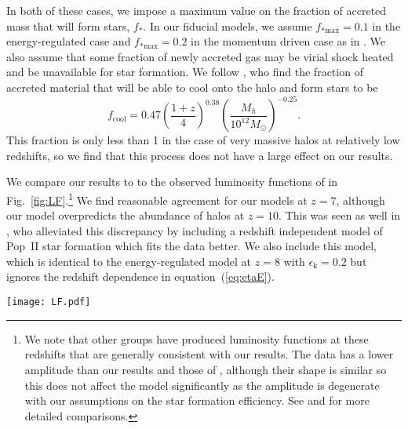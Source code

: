 \documentclass[a4paper,fleqn,usenatbib]{mnras}
\begin{document}
In both of these cases, we 
impose a maximum value on the fraction of accreted mass that will form stars, $f_\ast$. In our fiducial 
models, we assume $f_{\ast \text{max}} = 0.1$ in the energy-regulated case and $f_{\ast \text{max}} = 0.2$ in the momentum driven case as in \citet{furlanetto_2016}. We also assume that some fraction of newly accreted gas may be virial shock heated and be unavailable for star formation. We follow \citet{faucher_2011}, who find the fraction of accreted material that will be able to cool onto the halo and form stars to be
\begin{equation}
f_\text{cool} = 0.47 \left( \frac{1+z}{4} \right)^{0.38} \left( \frac{M_h}{10^{12} M_\odot} \right)^{-0.25}.
\end{equation}
This fraction is only less than 1 in the case of very massive halos at relatively 
low redshifts, so we find that this process does not have a large effect on our results.

We compare our results to to the observed luminosity functions of \citet{bouwens_2015} in Fig.~\ref{fig:LF}.\footnote{We note that other groups have produced luminosity functions at these redshifts \citep[e.g.,][]{mclure_2013, oesch_2013, schenker_2013, bowler_2015, finkelstein_2015} that are generally consistent with our results. The \citet{finkelstein_2015} data has a lower amplitude than our results and those of \citet{bouwens_2015}, although their shape is similar so this does not affect the model significantly as the amplitude is degenerate with our assumptions on the star formation efficiency. See \citet{mirocha_2016} and \citet{mason_2015} for more detailed comparisons.} We find reasonable agreement for our models at $z=7$, although our model overpredicts the abundance of halos at $z=10$. This was seen as well in \citet{furlanetto_2016}, who alleviated this discrepancy by including a redshift independent model of Pop~II star formation which fits the data better. We also include this model, which is identical to the energy-regulated model at $z=8$ with $\epsilon_\text{k} = 0.2$
but ignores the redshift dependence in 
equation~(\ref{eq:etaE}).

\begin{figure*}
	\texttt{[image: LF.pdf]}
    \caption{
    Luminosity functions for Pop~II stars in our fiducial model compared to the observed luminosity functions of \citet{bouwens_2015}. We do not include the luminosity functions for Pop~III stars as they are far too dim. In general, our results agree reasonably well with the data at $z=7$, but the energy- and momentum-regulated models overpredict the abundance of halos at $z=10$. We therefore also include a redshift-independent model 
    which fits the data better. Finally, we include an energy-regulated model with $\epsilon_\text{k}$ = 1 (i.e., all of the kinetic energy released by supernovae couples to a halo's gas to drive a wind).}
    \label{fig:LF}
\end{figure*}
\end{document}

